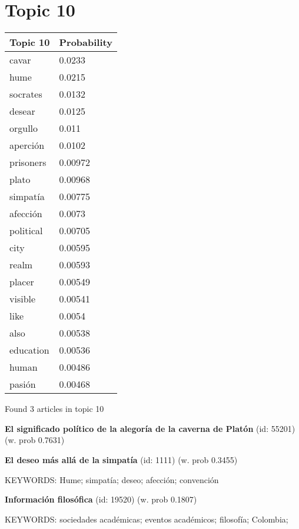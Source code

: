 \documentclass{article}
\begin{document}
\section*{Topic 10}\vfill
\begin{tabular}{ll}
\toprule
  Topic 10 & Probability \\
\midrule
     cavar &      0.0233 \\
      hume &      0.0215 \\
  socrates &      0.0132 \\
    desear &      0.0125 \\
   orgullo &       0.011 \\
  aperción &      0.0102 \\
 prisoners &     0.00972 \\
     plato &     0.00968 \\
  simpatía &     0.00775 \\
  afección &      0.0073 \\
 political &     0.00705 \\
      city &     0.00595 \\
     realm &     0.00593 \\
    placer &     0.00549 \\
   visible &     0.00541 \\
      like &      0.0054 \\
      also &     0.00538 \\
 education &     0.00536 \\
     human &     0.00486 \\
    pasión &     0.00468 \\
\bottomrule
\end{tabular}

\vfill
Found 3 articles in topic 10
\vfill

\textbf{El significado político de la alegoría de la caverna de Platón} (id: 55201)
 (w. prob 0.7631)
\vfill

\textbf{El deseo más allá de la simpatía} (id: 1111)
 (w. prob 0.3455)


KEYWORDS:
Hume; simpatía; deseo; afección; convención
\vfill

\textbf{Información filosófica} (id: 19520)
 (w. prob 0.1807)


KEYWORDS:
sociedades académicas; eventos académicos; filosofía; Colombia; 

\vfill
\newpage


\centering
\thispagestyle{empty}
\end{document}
